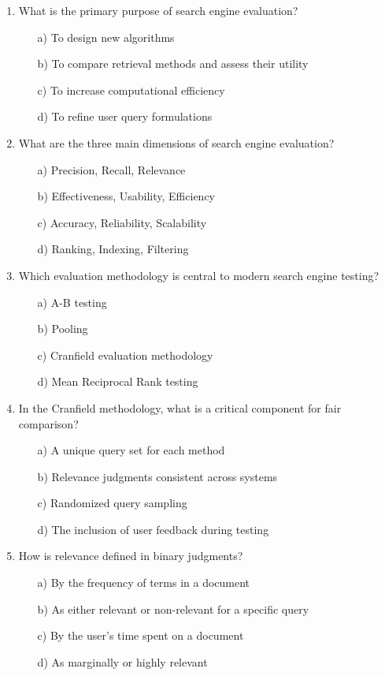 \documentclass[8pt]{extarticle}
\begin{document}
\begin{multicols}{2}
\begin{enumerate}
\item What is the primary purpose of search engine evaluation?
\begin{itemize}
\item[a)] To design new algorithms
\item[b)] To compare retrieval methods and assess their utility
\item[c)] To increase computational efficiency
\item[d)] To refine user query formulations
\end{itemize}

\item What are the three main dimensions of search engine evaluation?
\begin{itemize}
\item[a)] Precision, Recall, Relevance
\item[b)] Effectiveness, Usability, Efficiency
\item[c)] Accuracy, Reliability, Scalability
\item[d)] Ranking, Indexing, Filtering
\end{itemize}

\item Which evaluation methodology is central to modern search engine testing?
\begin{itemize}
\item[a)] A-B testing
\item[b)] Pooling
\item[c)] Cranfield evaluation methodology
\item[d)] Mean Reciprocal Rank testing
\end{itemize}

\item In the Cranfield methodology, what is a critical component for fair comparison?
\begin{itemize}
\item[a)] A unique query set for each method
\item[b)] Relevance judgments consistent across systems
\item[c)] Randomized query sampling
\item[d)] The inclusion of user feedback during testing
\end{itemize}

\item How is relevance defined in binary judgments?
\begin{itemize}
\item[a)] By the frequency of terms in a document
\item[b)] As either relevant or non-relevant for a specific query
\item[c)] By the user's time spent on a document
\item[d)] As marginally or highly relevant
\end{itemize}


\end{enumerate}
\end{multicols}
\end{document}
